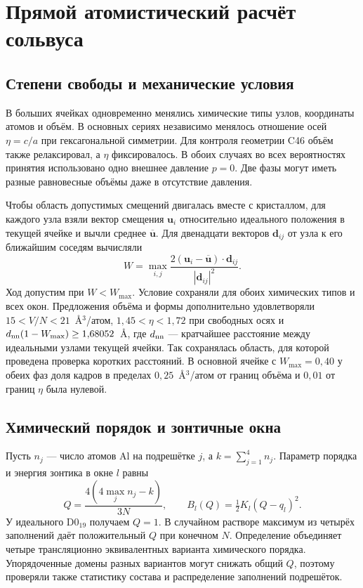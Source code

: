 \section{Прямой атомистический расчёт сольвуса}
\label{sec:ensemble}

\subsection{Степени свободы и механические условия}
В больших ячейках одновременно менялись химические типы узлов, координаты
атомов и объём. В основных сериях независимо менялось отношение осей
\(\eta=c/a\) при гексагональной симметрии. Для контроля геометрии C46
объём также релаксировал, а \(\eta\) фиксировалось. В обоих случаях
во всех вероятностях принятия использовано одно внешнее давление \(p=0\).
Две фазы могут иметь разные равновесные объёмы даже в отсутствие давления.

Чтобы область допустимых смещений двигалась вместе с кристаллом,
для каждого узла взяли вектор смещения \(\mathbf u_i\) относительно
идеального положения в текущей ячейке и вычли среднее
\(\overline{\mathbf u}\). Для двенадцати векторов \(\mathbf d_{ij}\)
от узла к его ближайшим соседям вычисляли
\[
 W=\max_{i,j}\frac{2(\mathbf u_i-\overline{\mathbf u})\cdot\mathbf d_{ij}}
                              {|\mathbf d_{ij}|^2}.
\]
Ход допустим при \(W<W_{\max}\). Условие сохраняли для обоих химических
типов и всех окон. Предложения объёма и формы дополнительно удовлетворяли
\(15<V/N<21\)~\AA$^3$/атом, \(1{,}45<\eta<1{,}72\) при свободных осях
и \(d_{\rm nn}(1-W_{\max})\ge 1{,}68052\)~\AA, где \(d_{\rm nn}\) —
кратчайшее расстояние между идеальными узлами текущей ячейки.
Так сохранялась область, для которой проведена проверка коротких расстояний.
В основной ячейке с \(W_{\max}=0{,}40\) у обеих фаз доля кадров в
пределах \(0{,}25\)~\AA$^3$/атом от границ объёма и \(0{,}01\) от
границ \(\eta\) была нулевой.

\subsection{Химический порядок и зонтичные окна}
Пусть \(n_j\) — число атомов Al на подрешётке \(j\), а \(k=\sum_{j=1}^4 n_j\).
Параметр порядка и энергия зонтика в окне \(l\) равны
\begin{equation}
 Q=\frac{4(4\max_j n_j-k)}{3N},\qquad
 B_l(Q)=\tfrac12 K_l(Q-q_l)^2 .
\end{equation}
У идеального D0$_{19}$ получаем \(Q=1\). В случайном растворе максимум
из четырёх заполнений даёт положительный \(Q\) при конечном \(N\).
Определение объединяет четыре трансляционно эквивалентных варианта
химического порядка. Упорядоченные домены разных
вариантов могут снижать общий \(Q\), поэтому проверяли также статистику
состава и распределение заполнений подрешёток.

